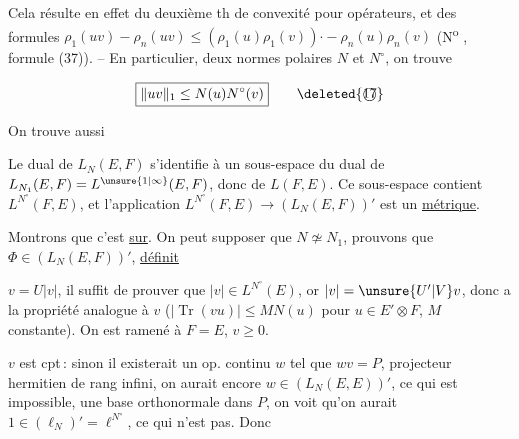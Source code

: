 
Cela résulte en effet  du deuxième th de convexité pour opérateurs, et des formules $\rho_1(uv){-}\rho_n(uv)\leq(\rho_1(u)\rho_1(v)){\cdot-}\rho_n(u)\rho_n(v)$ (N\textsuperscript{o} , formule (37)). -- En particulier,    deux normes polaires $N$ et $N^\circ$, on trouve



\[
\boxed{\lVert uv\rVert_1\leq N(u)N^\circ(v)}\tag*{\deleted{\textcircled{17}}}
\]

On trouve aussi  

Le dual de $L_N(E,F)$ s'identifie à un sous-espace du dual de \uline{$L_{N_1}(E,F)=L^{\unsure{1|\infty}}(E,F)$}, donc de $L(F,E)$. \margin{\textcolor{red}{$\vert$}} Ce sous-espace contient $L^{N^\circ}(F,E)$, et l'application $L^{N^\circ}(F,E)\to(L_N(E,F))'$ est un  \uline{métrique}.

Montrons que c'est \uline{sur}. On peut supposer que $N\not\simeq N_1$, prouvons que   $\Phi\in(L_N(E,F))'$, \uline{définit}  

$v=U|v|$, il suffit de prouver que $|v|\in L^{N^\circ}(E)$, or $|v|=\unsure{U'|V}v$, donc a la  propriété analogue à $v$ ($|\operatorname{Tr}(vu)|\leq M N(u)$ pour $u\in E'\otimes F$, $M$ constante). On est ramené à $F=E$, $v\geq 0$.

$v$ est cpt\,: sinon il existerait un op. continu $w$ tel que  $wv=P$, projecteur hermitien de rang infini,  on aurait encore $w\in(L_N(E,E))'$, ce qui est impossible,   une base orthonormale dans $P$, on voit qu'on aurait  $1\in(\ell_N)'=\ell^{N^\circ}$, ce qui n'est pas. Donc

